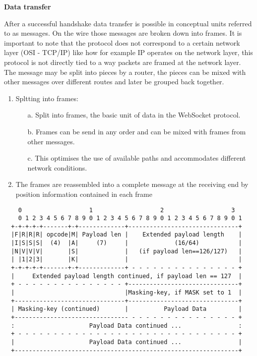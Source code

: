 \textbf{Data transfer}

After a successful handshake data transfer is possible in conceptual units referred to as messages. On the wire those messages are broken down into frames. It is important to note that the protocol does not correspond to a certain network layer (OSI - TCP/IP) like how for example IP operates on the network layer, this protocol is not directly tied to a way packets are framed at the network layer. The message may be split into pieces by a router, the pieces can be mixed with other messages over different routes and later be grouped back together. \cite{ws-rfc}

\begin{enumerate}
  \item Spltting into frames:
        \begin{enumerate}
          \item[a.] Split into frames, the basic unit of data in the WebSocket protocol.
          \item[b.] Frames can be send in any order and can be mixed with frames from other messages.
          \item[c.] This optimises the use of available paths and accommodates different network conditions.
        \end{enumerate}
  \item The frames are reassembled into a complete message at the receiving end by position information contained in each frame
\end{enumerate}

\begin{verbatim}
    0                   1                   2                   3
    0 1 2 3 4 5 6 7 8 9 0 1 2 3 4 5 6 7 8 9 0 1 2 3 4 5 6 7 8 9 0 1
  +-+-+-+-+-------+-+-------------+-------------------------------+
  |F|R|R|R| opcode|M| Payload len |    Extended payload length    |
  |I|S|S|S|  (4)  |A|     (7)     |             (16/64)           |
  |N|V|V|V|       |S|             |   (if payload len==126/127)   |
  | |1|2|3|       |K|             |                               |
  +-+-+-+-+-------+-+-------------+ - - - - - - - - - - - - - - - +
  |     Extended payload length continued, if payload len == 127  |
  + - - - - - - - - - - - - - - - +-------------------------------+
  |                               |Masking-key, if MASK set to 1  |
  +-------------------------------+-------------------------------+
  | Masking-key (continued)       |          Payload Data         |
  +-------------------------------- - - - - - - - - - - - - - - - +
  :                     Payload Data continued ...                :
  + - - - - - - - - - - - - - - - - - - - - - - - - - - - - - - - +
  |                     Payload Data continued ...                |
  +---------------------------------------------------------------+
\end{verbatim}

